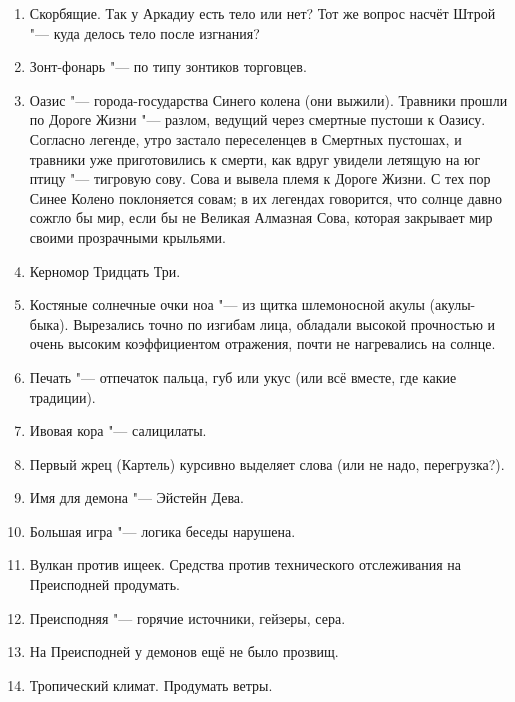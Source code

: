 \documentclass[a4paper,10pt,fleqn]{book}
\begin{document}
\begin{enumerate}

\item Скорбящие.
Так у Аркадиу есть тело или нет?
Тот же вопрос насчёт Штрой "--- куда делось тело после изгнания?

\item Зонт-фонарь "--- по типу зонтиков торговцев.

\item Оазис "--- города-государства Синего колена (они выжили).
Травники прошли по Дороге Жизни "--- разлом, ведущий через смертные пустоши к Оазису.
Согласно легенде, утро застало переселенцев в Смертных пустошах, и травники уже приготовились к смерти, как вдруг увидели летящую на юг птицу "--- тигровую сову.
Сова и вывела племя к Дороге Жизни.
С тех пор Синее Колено поклоняется совам;
в их легендах говорится, что солнце давно сожгло бы мир, если бы не Великая Алмазная Сова, которая закрывает мир своими прозрачными крыльями.

\item Керномор Тридцать Три.

\item Костяные солнечные очки ноа "--- из щитка шлемоносной акулы (акулы-быка).
Вырезались точно по изгибам лица, обладали высокой прочностью и очень высоким коэффициентом отражения, почти не нагревались на солнце.

\item Печать "--- отпечаток пальца, губ или укус (или всё вместе, где какие традиции).

\item Ивовая кора "--- салицилаты.

\item Первый жрец (Картель) курсивно выделяет слова (или не надо, перегрузка?).

\item Имя для демона "--- Эйстейн Дева.

\item Большая игра "--- логика беседы нарушена.

\item Вулкан против ищеек.
Средства против технического отслеживания на Преисподней продумать.

\item Преисподняя "--- горячие источники, гейзеры, сера.

\item На Преисподней у демонов ещё не было прозвищ.

\item Тропический климат.
Продумать ветры.


\end{enumerate}
\end{document}
